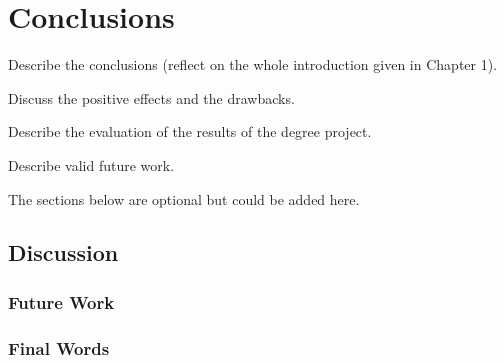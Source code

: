 \chapter{Conclusions}
Describe the conclusions (reflect on the whole introduction given in Chapter 1). 

Discuss the positive effects and the drawbacks. 

Describe the evaluation of the results of the degree project.

Describe valid future work.  

The sections below are optional but could be added here.

\section{Discussion}

\subsection{Future Work}

\subsection{Final Words}








